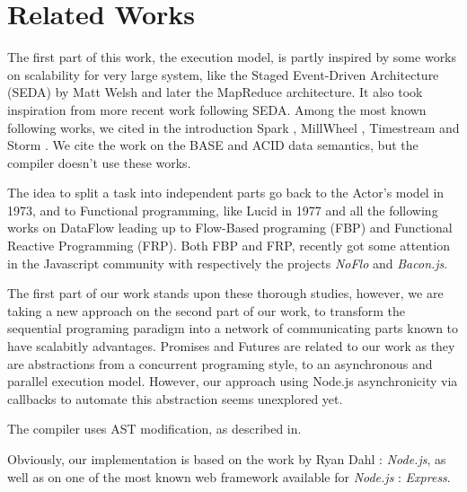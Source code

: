 \section{Related Works} \label{section:related}

The first part of this work, the execution model, is partly inspired by some works on scalability for very large system, like the Staged Event-Driven Architecture (SEDA) by Matt Welsh\cite{Welsh2000} and later the MapReduce architecture\cite{Dean2008}.
It also took inspiration from more recent work following SEDA.
Among the most known following works, we cited in the introduction Spark \cite{Zaharia2010}, MillWheel \cite{Akidau2013}, Timestream \cite{Qian2013} and Storm \cite{Marz2011}.
We cite the work on the BASE\cite{Fox1997} and ACID data semantics, but the compiler doesn't use these works.

The idea to split a task into independent parts go back to the Actor's model\cite{Hewitt1973} in 1973, and to Functional programming, like Lucid\cite{Ashcroft1977} in 1977 and all the following works on DataFlow leading up to Flow-Based programing (FBP)\cite{Morrison1994a} and Functional Reactive Programming (FRP)\cite{Elliott1997}.
Both FBP and FRP, recently got some attention in the Javascript community with respectively the projects \textit{NoFlo}\cite{NoFlo} and \textit{Bacon.js}\cite{Paananen2012}.

The first part of our work stands upon these thorough studies, however, we are taking a new approach on the second part of our work, to transform the sequential programing paradigm into a network of communicating parts known to have scalabitly advantages.
Promises\cite{Liskov1988} and Futures are related to our work as they are abstractions from a concurrent programing style, to an asynchronous and parallel execution model.
However, our approach using Node.js asynchronicity via callbacks to automate this abstraction seems unexplored yet.

The compiler uses AST modification, as described in\cite{Jones2003}.

Obviously, our implementation is based on the work by Ryan Dahl : \textit{Node.js}\cite{Dahl}, as well as on one of the most known web framework available for \textit{Node.js} : \textit{Express}\cite{express}.